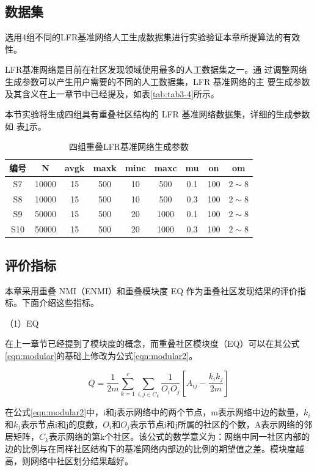 \subsection{数据集}
选用4组不同的LFR基准网络人工生成数据集进行实验验证本章所提算法的有效性。 

LFR基准网络是目前在社区发现领域使用最多的人工数据集之一。通
过调整网络生成参数可以产生用户需要的不同的人工数据集，LFR 基准网络的主
要生成参数及其含义在上一章节中已经提及，如表\ref{tab:tab3-4}所示。

本节实验将生成四组具有重叠社区结构的 LFR 基准网络数据集，详细的生成参数如
表\ref{tab:tab4-1}示。 

\begin{table}
  \centering
  \caption{四组重叠LFR基准网络生成参数} \label{tab:tab4-1}
  \begin{tabular*}{0.9\textwidth}{@{\extracolsep{\fill}}ccccccccc}
  \toprule
    编号		&N  &avgk &maxk &minc &maxc &mu &on &om\\
  \midrule
    S7	&10000  &15 &500 &10 &500 &0.1 &100 &$2\sim 8$\\
    S8 &10000  &15 &500 &10 &500 &0.3 &100 &$2\sim 8$\\
    S9 &50000  &15 &500 &20 &1000 &0.1 &100 &$2\sim 8$\\
    S10 &50000  &15 &500 &20 &1000 &0.3 &100 &$2\sim 8$\\
  \bottomrule
  \end{tabular*}
\end{table}

\subsection{评价指标}
本章采用重叠 NMI（ENMI）\cite{Lancichinetti2009Detecting}和重叠模块度 EQ
\cite{Lancichinetti2010Finding}作为重叠社区发现结果的评价指标。下面介绍这些指标。

（1）EQ

在上一章节已经提到了模块度的概念，而重叠社区模块度（EQ）\cite{Lancichinetti2010Finding}可以在其公式\ref{eqn:modular}的基础上修改为公式\ref{eqn:modular2}。

\begin{equation}
  \label{eqn:modular2}
  Q=\frac{1}{2m} \sum_{k=1}^c \sum_{i,j \in C_k} \frac{1}{O_iO_j} \left [ A_{ij}-\frac{k_ik_j}{2m} \right ]  
\end{equation}

在公式\ref{eqn:modular2}中，i和j表示网络中的两个节点，m表示网络中边的数量，$k_i$和$k_j$表示节点i和j的度数，$O_i$和$O_j$表示节点i和j所属的社区的个数，A表示网络的邻居矩阵，$C_k$表示网络的第k个社区。该公式的数学意义为：网络中同一社区内部的边的比例与在同样社区结构下的基准网络内部边的比例的期望值之差。模块度越高，则网络中社区划分结果越好。


